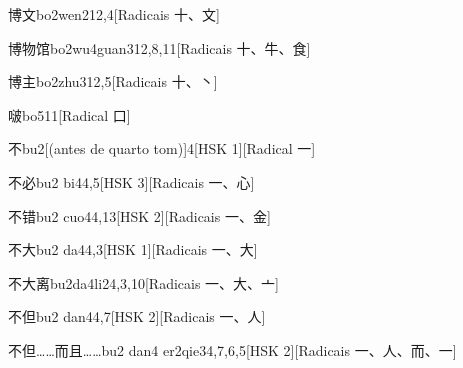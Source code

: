 \begin{entry}{博文}{bo2wen2}{12,4}[Radicais ⼗、⽂]
\end{entry}

\begin{entry}{博物馆}{bo2wu4guan3}{12,8,11}[Radicais ⼗、⽜、⾷]
\end{entry}

\begin{entry}{博主}{bo2zhu3}{12,5}[Radicais ⼗、⼂]
\end{entry}

\begin{entry}{啵}{bo5}{11}[Radical ⼝]
\end{entry}

\begin{entry}{不}{bu2}[(antes de quarto tom)]{4}[HSK 1][Radical ⼀]
\end{entry}

\begin{entry}{不必}{bu2 bi4}{4,5}[HSK 3][Radicais ⼀、⼼]
\end{entry}

\begin{entry}{不错}{bu2 cuo4}{4,13}[HSK 2][Radicais ⼀、⾦]
\end{entry}

\begin{entry}{不大}{bu2 da4}{4,3}[HSK 1][Radicais ⼀、⼤]
\end{entry}

\begin{entry}{不大离}{bu2da4li2}{4,3,10}[Radicais ⼀、⼤、⼇]
\end{entry}

\begin{entry}{不但}{bu2 dan4}{4,7}[HSK 2][Radicais ⼀、⼈]
\end{entry}

\begin{entry}{不但……而且……}{bu2 dan4 er2qie3}{4,7,6,5}[HSK 2][Radicais ⼀、⼈、⽽、⼀]
\end{entry}

